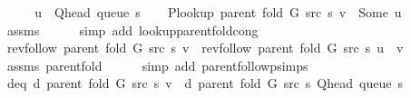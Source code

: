 \begin{isabellebody}
%
\isadelimproof
%
\endisadelimproof
%
\isatagproof
{}\isamarkupfalse%
\ {\isacharminus}{\kern0pt}\isanewline
\ \ \isamarkupfalse%
\ {\isacharquery}{\kern0pt}u\ {\isacharequal}{\kern0pt}\ {\isachardoublequoteopen}Q{\isacharunderscore}{\kern0pt}head\ {\isacharparenleft}{\kern0pt}queue\ s{\isacharparenright}{\kern0pt}{\isachardoublequoteclose}\isanewline
\ \ \isamarkupfalse%
\ {\isachardoublequoteopen}P{\isacharunderscore}{\kern0pt}lookup\ {\isacharparenleft}{\kern0pt}parent\ {\isacharparenleft}{\kern0pt}fold\ G\ src\ s{\isacharparenright}{\kern0pt}{\isacharparenright}{\kern0pt}\ v\ {\isacharequal}{\kern0pt}\ Some\ {\isacharquery}{\kern0pt}u{\isachardoublequoteclose}\isanewline
\ \ \ \ \isamarkupfalse%
\ assms\isanewline
\ \ \ \ \isamarkupfalse%
\ {\isacharparenleft}{\kern0pt}simp\ add{\isacharcolon}{\kern0pt}\ lookup{\isacharunderscore}{\kern0pt}parent{\isacharunderscore}{\kern0pt}fold{\isacharunderscore}{\kern0pt}cong{\isacharparenright}{\kern0pt}\isanewline
\ \ \isamarkupfalse%
\ {\isachardoublequoteopen}rev{\isacharunderscore}{\kern0pt}follow\ {\isacharparenleft}{\kern0pt}parent\ {\isacharparenleft}{\kern0pt}fold\ G\ src\ s{\isacharparenright}{\kern0pt}{\isacharparenright}{\kern0pt}\ v\ {\isacharequal}{\kern0pt}\ rev{\isacharunderscore}{\kern0pt}follow\ {\isacharparenleft}{\kern0pt}parent\ {\isacharparenleft}{\kern0pt}fold\ G\ src\ s{\isacharparenright}{\kern0pt}{\isacharparenright}{\kern0pt}\ {\isacharquery}{\kern0pt}u\ {\isacharat}{\kern0pt}\ {\isacharbrackleft}{\kern0pt}v{\isacharbrackright}{\kern0pt}{\isachardoublequoteclose}\isanewline
\ \ \ \ \isamarkupfalse%
\ assms{\isacharparenleft}{\kern0pt}{}{\isacharparenright}{\kern0pt}\ parent{\isacharunderscore}{\kern0pt}fold\isanewline
\ \ \ \ \isamarkupfalse%
\ {\isacharparenleft}{\kern0pt}simp\ add{\isacharcolon}{\kern0pt}\ parent{\isachardot}{\kern0pt}follow{\isacharunderscore}{\kern0pt}psimps{\isacharparenright}{\kern0pt}\isanewline
\ \ \isamarkupfalse%
\ d{\isacharunderscore}{\kern0pt}eq{\isacharcolon}{\kern0pt}\ {\isachardoublequoteopen}d\ {\isacharparenleft}{\kern0pt}parent\ {\isacharparenleft}{\kern0pt}fold\ G\ src\ s{\isacharparenright}{\kern0pt}{\isacharparenright}{\kern0pt}\ v\ {\isacharequal}{\kern0pt}\ d\ {\isacharparenleft}{\kern0pt}parent\ {\isacharparenleft}{\kern0pt}fold\ G\ src\ s{\isacharparenright}{\kern0pt}{\isacharparenright}{\kern0pt}\ {\isacharparenleft}{\kern0pt}Q{\isacharunderscore}{\kern0pt}head\ {\isacharparenleft}{\kern0pt}queue\ s{\isacharparenright}{\kern0pt}{\isacharparenright}{\kern0pt}\ {\isacharplus}{\kern0pt}\ {}{\isachardoublequoteclose}\isanewline

\end{isabellebody}

